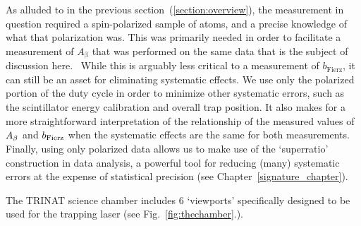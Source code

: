 
% 
As alluded to in the previous section~(\ref{section:overview}), the measurement in question required a spin-polarized sample of atoms, and a precise knowledge of what that polarization was.  This was primarily needed in order to facilitate a measurement of $A_{\mathrm{\beta}}$ 
that was performed on the same data that is the subject of discussion here.~\cite{ben_Abeta}   
While this is arguably less critical to a measurement of $b_{\mathrm{Fierz}}$, it can still be an asset for eliminating systematic effects.    
We use only the polarized portion of the duty cycle in order to minimize other systematic errors, such as the scintillator energy calibration and overall trap position.  It also makes for a more straightforward interpretation of the relationship of the measured values of $A_{\beta}$ and $b_{\mathrm{Fierz}}$ when the systematic effects are the same for both measurements. Finally, using only polarized data allows us to make use of the `superratio' construction in data analysis, a powerful tool for reducing (many) systematic errors at the expense of statistical precision (see Chapter~\ref{signature_chapter}).

The TRINAT science chamber includes 6 `viewports' specifically designed to be used for the trapping laser (see Fig.~\ref{fig:thechamber}.).



